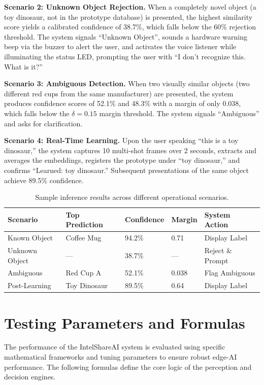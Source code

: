 \documentclass[12pt,a4paper]{report}
\begin{document}
\textbf{Scenario 2: Unknown Object Rejection.} When a completely novel object (a toy dinosaur, not in the prototype database) is presented, the highest similarity score yields a calibrated confidence of 38.7\%, which falls below the 60\% rejection threshold. The system signals ``Unknown Object'', sounds a hardware warning beep via the buzzer to alert the user, and activates the voice listener while illuminating the status LED, prompting the user with ``I don't recognize this. What is it?''

\textbf{Scenario 3: Ambiguous Detection.} When two visually similar objects (two different red cups from the same manufacturer) are presented, the system produces confidence scores of 52.1\% and 48.3\% with a margin of only 0.038, which falls below the $\delta = 0.15$ margin threshold. The system signals ``Ambiguous'' and asks for clarification.

\textbf{Scenario 4: Real-Time Learning.} Upon the user speaking ``this is a toy dinosaur,'' the system captures 10 multi-shot frames over 2 seconds, extracts and averages the embeddings, registers the prototype under ``toy dinosaur,'' and confirms ``Learned: toy dinosaur.'' Subsequent presentations of the same object achieve 89.5\% confidence.

\begin{table}[H]
    \caption{Sample inference results across different operational scenarios.}
    \vspace{0.5em}
    \centering
    \renewcommand{\arraystretch}{1.2}
    \small
    \begin{tabular}{|p{2.5cm}|p{2.5cm}|p{1.5cm}|p{1.5cm}|p{2.5cm}|}
        \hline
        \textbf{Scenario} & \textbf{Top Prediction} & \textbf{Confidence} & \textbf{Margin} & \textbf{System Action} \\
        \hline
        Known Object & Coffee Mug & 94.2\% & 0.71 & Display Label \\
        \hline
        Unknown Object & --- & 38.7\% & --- & Reject \& Prompt \\
        \hline
        Ambiguous & Red Cup A & 52.1\% & 0.038 & Flag Ambiguous \\
        \hline
        Post-Learning & Toy Dinosaur & 89.5\% & 0.64 & Display Label \\
        \hline
    \end{tabular}
\end{table}


\section{Testing Parameters and Formulas}
The performance of the IntelShareAI system is evaluated using specific mathematical frameworks and tuning parameters to ensure robust edge-AI performance. The following formulas define the core logic of the perception and decision engines.
\end{document}
